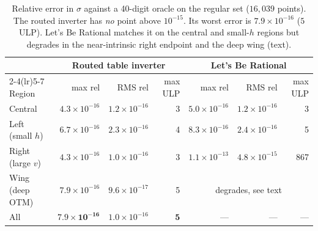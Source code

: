 \documentclass[11pt]{article}
\begin{document}
\begin{table}[t]
\centering
\small
\begin{tabular}{l r r r r r r}
\toprule
 & \multicolumn{3}{c}{Routed table inverter} & \multicolumn{3}{c}{Let's Be Rational} \\
\cmidrule(lr){2-4}\cmidrule(lr){5-7}
Region & max rel & RMS rel & max ULP & max rel & RMS rel & max ULP \\
\midrule
Central          & $4.3\times10^{-16}$ & $1.2\times10^{-16}$ & 3 & $5.0\times10^{-16}$ & $1.2\times10^{-16}$ & 3 \\
Left (small $h$) & $6.7\times10^{-16}$ & $2.3\times10^{-16}$ & 4 & $8.3\times10^{-16}$ & $2.4\times10^{-16}$ & 5 \\
Right (large $v$)& $4.3\times10^{-16}$ & $1.0\times10^{-16}$ & 3 & $1.1\times10^{-13}$ & $4.8\times10^{-15}$ & 867 \\
Wing (deep OTM)  & $7.9\times10^{-16}$ & $9.6\times10^{-17}$ & 5 & \multicolumn{3}{c}{degrades, see text} \\
\midrule
All              & $\mathbf{7.9\times10^{-16}}$ & $1.0\times10^{-16}$ & $\mathbf{5}$ & --- & --- & --- \\
\bottomrule
\end{tabular}
\caption{Relative error in $\sigma$ against a 40-digit oracle on the regular set ($16{,}039$ points). The routed inverter has \emph{no} point above $10^{-15}$. Its worst error is $7.9\times10^{-16}$ ($5$ ULP). Let's Be Rational matches it on the central and small-$h$ regions but degrades in the near-intrinsic right endpoint and the deep wing (text).}
\label{tab:accuracy}
\end{table}
\end{document}
